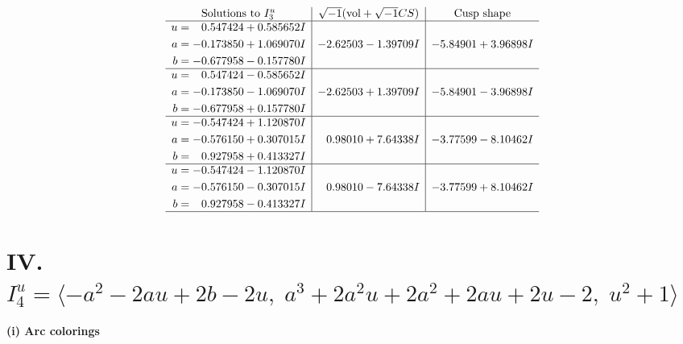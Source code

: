 \documentclass[1p]{elsarticle_modified}
\theoremstyle{definition}
\newcommand{\I}{\sqrt{-1}}
\begin{document}
$$\begin{array}{c|c|c}  
\text{Solutions to }I^u_{3}& \I (\text{vol} + \sqrt{-1}CS) & \text{Cusp shape}\\
 \hline 
\begin{aligned}
u &= \phantom{-}0.547424 + 0.585652 I \\
a &= -0.173850 + 1.069070 I \\
b &= -0.677958 - 0.157780 I\end{aligned}
 & -2.62503 - 1.39709 I & -5.84901 + 3.96898 I \\ \hline\begin{aligned}
u &= \phantom{-}0.547424 - 0.585652 I \\
a &= -0.173850 - 1.069070 I \\
b &= -0.677958 + 0.157780 I\end{aligned}
 & -2.62503 + 1.39709 I & -5.84901 - 3.96898 I \\ \hline\begin{aligned}
u &= -0.547424 + 1.120870 I \\
a &= -0.576150 + 0.307015 I \\
b &= \phantom{-}0.927958 + 0.413327 I\end{aligned}
 & \phantom{-}0.98010 + 7.64338 I & -3.77599 - 8.10462 I \\ \hline\begin{aligned}
u &= -0.547424 - 1.120870 I \\
a &= -0.576150 - 0.307015 I \\
b &= \phantom{-}0.927958 - 0.413327 I\end{aligned}
 & \phantom{-}0.98010 - 7.64338 I & -3.77599 + 8.10462 I\\
 \hline 
 \end{array}$$\newpage\newpage\renewcommand{\arraystretch}{1}
\centering \section*{IV. $I^u_{4}= \langle - a^2-2 a u+2 b-2 u,\;a^3+2 a^2 u+2 a^2+2 a u+2 u-2,\;u^2+1 \rangle$}
\flushleft \textbf{(i) Arc colorings}\\
\end{document}
